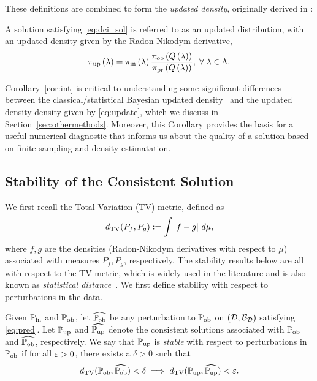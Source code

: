 These definitions are combined to form the \emph{updated density}, originally derived in \cite{BJW18}:

\begin{defn}\label{defn:updated}
  A solution satisfying \eqref{eq:dci_sol} is referred to as an updated distribution, with an updated density given by the Radon-Nikodym derivative, 
  \begin{equation}\label{eq:update}
    \operatorname*{\pi_{up}} \left ( \lambda \right ) = \operatorname*{\pi_{in}} \left ( \lambda \right ) \frac{\operatorname*{\pi_{ob}} \left ( Q\left ( \lambda \right ) \right ) }{\operatorname*{\pi_{pr}} \left ( Q\left ( \lambda \right ) \right ) }, \; \forall \; \lambda \in {\Lambda}.
  \end{equation}
\end{defn}

Corollary~\ref{cor:int} is critical to understanding some significant differences between the classical/statistical Bayesian updated density~\cite{Smith} and the updated density density given by \eqref{eq:update}, which we discuss in Section~\ref{sec:othermethods}.
Moreover, this Corollary provides the basis for a useful numerical diagnostic that informs us about the quality of a solution based on finite sampling and density estimatation.



\subsection{Stability of the Consistent Solution}\label{sec:stability}

We first recall the Total Variation (TV) metric, defined as 
\begin{equation}\label{eq:tv}
d_{\text{TV}} (P_f, P_g) := \int \left\vert f - g\right\vert \, d\mu,
\end{equation}
where $f,g$ are the densities (Radon-Nikodym derivatives with respect to $\mu$) associated with measures $P_f, P_g$, respectively.
The stability results below are all with respect to the TV metric, which is widely used in the literature and is also known as \emph{statistical distance}~\cite{GS02, Smith, Silverman}.
We first define stability with respect to perturbations in the data.

\begin{defn}\label{defn:stableobs}
  Given $\operatorname*{\mathbb{P}_{in}}$ and $\operatorname*{\mathbb{P}_{ob}}$, let $\widehat{\operatorname*{\mathbb{P}_{ob}}}$ be any perturbation to $\operatorname*{\mathbb{P}_{ob}}$ on $(\mathcal{D}, \mathcal{B}_{\mathcal{D}})$ satisfying \eqref{eq:pred}. 
  Let $\operatorname*{\mathbb{P}_{up}}$ and $\widehat{\operatorname*{\mathbb{P}_{up}}}$ denote the consistent solutions associated with $\operatorname*{\mathbb{P}_{ob}}$ and $\widehat{\operatorname*{\mathbb{P}_{ob}}}$, respectively. 
  We say that $\operatorname*{\mathbb{P}_{up}}$ is \emph{stable} with respect to perturbations in $\operatorname*{\mathbb{P}_{ob}}$ if for all $\varepsilon > 0$, there exists a $\delta > 0$ such that
  \begin{equation}
    d_{\text{TV}} (\operatorname*{\mathbb{P}_{ob}}, \widehat{\operatorname*{\mathbb{P}_{ob}}}) < \delta \implies d_{\text{TV}} (\operatorname*{\mathbb{P}_{up}}, \widehat{\operatorname*{\mathbb{P}_{up}}}) < \varepsilon.
  \end{equation}
\end{defn}

